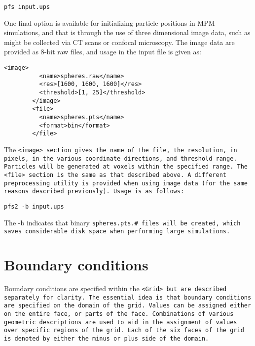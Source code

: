 \begin{Verbatim}[fontsize=\footnotesize]
   pfs input.ups
\end{Verbatim}

One final option is available for initializing particle positions in MPM
simulations, and that is through the use of three dimensional image data,
such as might be collected via CT scans or confocal microscopy.  The image data are provided as 8-bit raw files, and usage in the input file is given as:

\begin{Verbatim}[fontsize=\footnotesize]
        <image>
          <name>spheres.raw</name>
          <res>[1600, 1600, 1600]</res>
          <threshold>[1, 25]</threshold>
        </image>
        <file>
          <name>spheres.pts</name>
          <format>bin</format>
        </file>
\end{Verbatim}

The \tt <image> \normalfont section gives the name of the file, the resolution, in pixels,
in the various coordinate directions, and threshold range.  Particles will be
generated at voxels within the specified range.  The \tt <file> \normalfont
section is the same as that described above.  A different preprocessing utility
is provided when using image data (for the same reasons described previously).
Usage is as follows:

\begin{Verbatim}[fontsize=\footnotesize]
   pfs2 -b input.ups
\end{Verbatim}

The -b indicates that binary \tt spheres.pts.\# \normalfont files will be created, which
saves considerable disk space when performing large simulations.


\section{Boundary conditions}\label{sec:ucf_bc}

Boundary conditions are specified within the \tt <Grid> \normalfont
but are described separately for clarity.  The essential idea is that
boundary conditions are specified on the domain of the grid.  Values
can be assigned either on the entire face, or parts of the face.
Combinations of various geometric descriptions are used to aid in the
assignment of values over specific regions of the grid.  Each of the
six faces of the grid is denoted by either the minus or plus side of
the domain.

